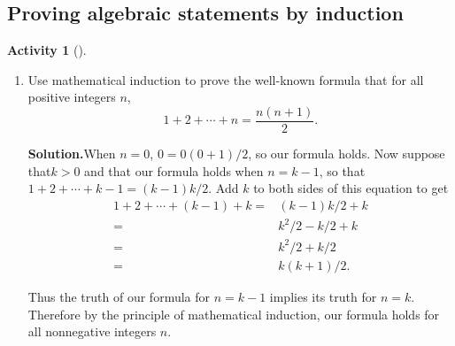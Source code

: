 \documentclass[10pt,]{book}
\theoremstyle{plain}
\theoremstyle{definition}
\newtheorem{activity}[project]{Activity}
\numberwithin{equation}{chapter}
\newcommand{\amp}{&}
\begin{document}
\subsection[{Proving algebraic statements by induction}]{Proving algebraic statements by induction}\label{subsection-76}
\begin{activity}[]\label{activity-346}
~\par
\begin{enumerate}[label=(\alph*)]
 \item Use mathematical induction to prove the well-known formula that for all positive integers \(n\),%
\begin{equation*}
1+2 + \cdots +n = \frac{n(n+1)}{2}.
\end{equation*}
%
\par\medskip\noindent%
\textbf{Solution.}\quad When \(n=0\), \(0=0(0+1)/2\), so our formula holds. Now suppose that\(k>0\) and that our formula holds when \(n=k-1\), so that \(1+2+\cdots+k-1=(k-1)k/2\). Add \(k\) to both sides of this equation to get%
\begin{align*}
1+2+\cdots+(k-1)+k =\amp  (k-1)k/2 +k\\
=\amp  k^2/2-k/2+k\\
=\amp
k^2/2+k/2\\
=\amp k(k+1)/2.
\end{align*}
%
\par
Thus the truth of our formula for \(n=k-1\) implies its truth for \(n=k\). Therefore by the principle of mathematical induction, our formula holds for all nonnegative integers \(n\).%


\end{enumerate}
\end{activity}
\end{document}

